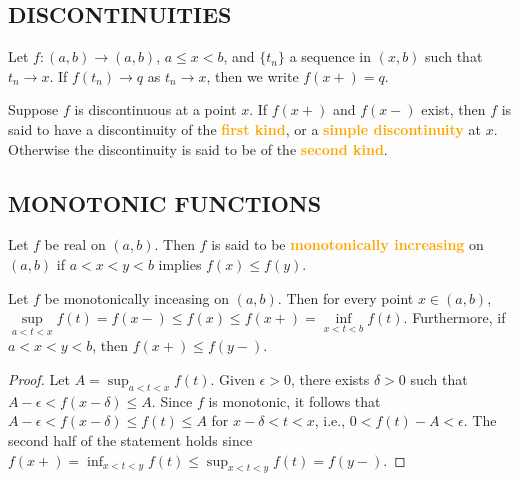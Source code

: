 \subsection{DISCONTINUITIES}

\begin{definition}
Let $f:(a,b)\to (a,b)$, $a\leq x<b$, and $\{t_n\}$ a sequence in $(x,b)$ such that $t_n\to x$. If $f(t_n)\to q$ as $t_n\to x$, then we write $f(x+)=q$. 
\end{definition}

\begin{definition}
Suppose $f$ is discontinuous at a point $x$. If $f(x+)$ and $f(x-)$ exist, then $f$ is said to have a discontinuity of the \textbf{\textcolor{orange}{first kind}}, or a \textbf{\textcolor{orange}{simple discontinuity}} at $x$. Otherwise the discontinuity is said to be of the \textbf{\textcolor{orange}{second kind}}.
\end{definition}

\subsection{MONOTONIC FUNCTIONS}
\begin{definition}
Let $f$ be real on $(a,b)$. Then $f$ is said to be \textbf{\textcolor{orange}{monotonically increasing}} on $(a,b)$ if $a<x<y<b$ implies $f(x)\leq f(y)$.
\end{definition}

\begin{theorem}
Let $f$ be monotonically inceasing on $(a,b)$. Then for every point $x\in (a,b)$, $\sup\limits_{a<t<x}f(t)=f(x-)\leq f(x)\leq f(x+)=\inf\limits_{x<t<b}f(t)$. Furthermore, if $a<x<y<b$, then $f(x+)\leq f(y-)$.
\end{theorem}
\begin{proof}
Let $A=\sup_{a<t<x}f(t)$. Given $\epsilon>0$, there exists $\delta>0$ such that $A-\epsilon<f(x-\delta)\leq A$. Since $f$ is monotonic, it follows that $A-\epsilon<f(x-\delta)\leq f(t)\leq A$ for $x-\delta<t<x$, i.e., $0<f(t)-A<\epsilon$. The second half of the statement holds since $f(x+) = \inf_{x<t<y}f(t)\leq \sup_{x<t<y}f(t)=f(y-)$.
\end{proof}

